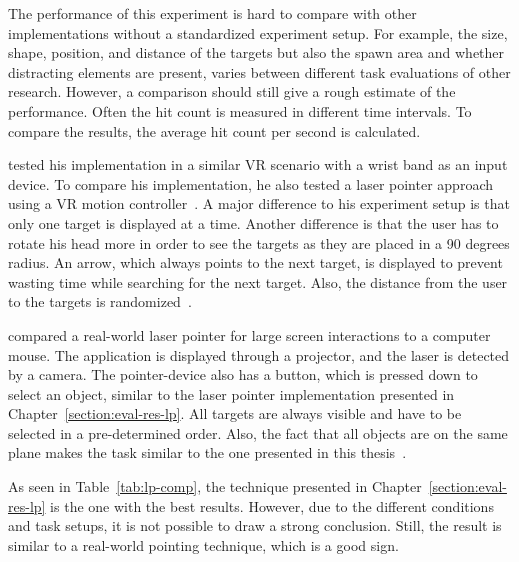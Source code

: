 The performance of this experiment is hard to compare with other implementations without a standardized experiment setup. For example, the size, shape, position, and distance of the targets but also the spawn area and whether distracting elements are present, varies between different task evaluations of other research. However, a comparison should still give a rough estimate of the performance. Often the hit count is measured in different time intervals. To compare the results, the average hit count per second is calculated.

\citeauthor{Kamm.2018} tested his implementation in a similar \gls{VR} scenario with a wrist band as an input device. To compare his implementation, he also tested a laser pointer approach using a \gls{VR} motion controller~\cite[39]{Kamm.2018}. A major difference to his experiment setup is that only one target is displayed at a time. Another difference is that the user has to rotate his head more in order to see the targets as they are placed in a 90 degrees radius. An arrow, which always points to the next target, is displayed to prevent wasting time while searching for the next target. Also, the distance from the user to the targets is randomized~\cite[45]{Kamm.2018}.

\citeauthor{JiYoungOh.2002} compared a real-world laser pointer for large screen interactions to a computer mouse. The application is displayed through a projector, and the laser is detected by a camera. The pointer-device also has a button, which is pressed down to select an object, similar to the laser pointer implementation presented in Chapter~\ref{section:eval-res-lp}. All targets are always visible and have to be selected in a pre-determined order. Also, the fact that all objects are on the same plane makes the task similar to the one presented in this thesis~\cite[3\psq]{JiYoungOh.2002}.

As seen in Table~\ref{tab:lp-comp}, the technique presented in Chapter~\ref{section:eval-res-lp} is the one with the best results. However, due to the different conditions and task setups, it is not possible to draw a strong conclusion. Still, the result is similar to a real-world pointing technique, which is a good sign.

